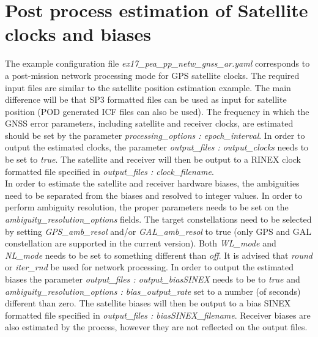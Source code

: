 \section{Post process estimation of Satellite clocks and biases}
The example configuration file \textit{ex17\_pea\_pp\_netw\_gnss\_ar.yaml} corresponds to a post-mission network processing mode for GPS satellite clocks.
The required input files are similar to the satellite position estimation example.
The main difference will be that SP3 formatted files can be used as input for satellite position (POD generated ICF files can also be used).
The frequency in which the GNSS error parameters, including satellite and receiver clocks, are estimated should be set by the parameter \textit{processing\_options : epoch\_interval}. 
In order to output the estimated clocks, the parameter  \textit{output\_files : output\_clocks} needs to be set to \textit{true}.
The satellite and receiver will then be output to a RINEX clock formatted file specified in \textit{output\_files : clock\_filename}.\\
 
In order to estimate the satellite and receiver hardware biases, the ambiguities need to be separated from the biases and resolved to integer values. 
In order to perform ambiguity resolution, the proper parameters needs to be set on the \textit{ambiguity\_resolution\_options} fields. 
The target constellations need to be selected by setting  \textit{GPS\_amb\_resol} and/or \textit{GAL\_amb\_resol} to true (only GPS and GAL constellation are supported in the current version). 
Both \textit{WL\_mode} and \textit{NL\_mode} needs to be set to something different than \textit{off}. 
It is advised that \textit{round} or \textit{iter\_rnd} be used for network processing. 
In order to output the estimated biases the parameter  \textit{output\_files : output\_biasSINEX} needs to be to \textit{true} and \textit{ambiguity\_resolution\_options : bias\_output\_rate} set to a number (of seconds) different than zero.
The satellite biases will then be output to a bias SINEX formatted file specified in \textit{output\_files : biasSINEX\_filename}.
Receiver biases are also estimated by the process, however they are not reflected on the output files.\\

